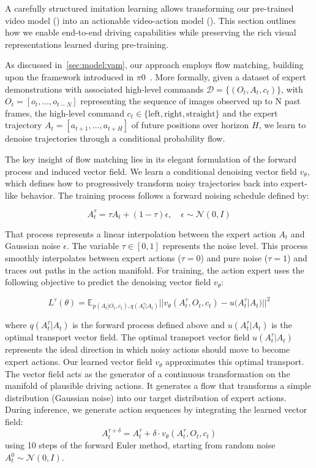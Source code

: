 A carefully structured imitation learning allows transforming our pre-trained video model (\vm{}) into an actionable video-action model (\vam{}). This section outlines how we enable end-to-end driving capabilities while preserving the rich visual representations learned during pre-training.

As discussed in~\autoref{sec:model:vam}, our approach employs flow matching, building upon the framework introduced in $\pi$0~\cite{black2024pi0}. More formally, given a dataset of expert demonstrations with associated high-level commands $\mathcal{D} = \{(O_t, A_t, c_t)\}$, with $O_t = [o_{t}, \dots, o_{t-N}]$ representing the sequence of images observed up to N past frames, the high-level command $c_t \in \{\text{left}, \text{right}, \text{straight}\}$ and the expert trajectory $A_t = [a_{t+1}, \dots, a_{t+H}]$ of future positions over horizon $H$, we learn to denoise trajectories through a conditional probability flow.


The key insight of flow matching lies in its elegant formulation of the forward process and induced vector field. We learn a conditional denoising vector field $v_\theta$, which defines how to progressively transform noisy trajectories back into expert-like behavior. The training process follows a forward noising schedule defined by:

\begin{equation}
    A^\tau_t = \tau A_t + (1-\tau)\epsilon, \quad \epsilon \sim \mathcal{N}(0, I)
    \label{eq:noised_action}
\end{equation}

That process represents a linear interpolation between the expert action $A_t$ and Gaussian noise $\epsilon$. The variable $\tau \in [0,1]$ represents the noise level. This process smoothly interpolates between expert actions ($\tau = 0$) and pure noise ($\tau = 1$) and traces out paths in the action manifold. For training, the action expert uses the following objective to predict the denoising vector field $v_\theta$:

\begin{equation}
    L^\tau(\theta) = \mathbb{E}_{p(A_t|O_t, c_t),q(A^\tau_t | A_t)} ||v_\theta(A^\tau_t, O_t, c_t) - u(A^\tau_t|A_t)||^2
\end{equation}

where $q(A^\tau_t|A_t)$ is the forward process defined above and $u(A^\tau_t|A_t)$ is the optimal transport vector field. The optimal transport vector field $u(A^\tau_t|A_t)$ represents the ideal direction in which noisy actions should move to become expert actions. Our learned vector field $v_\theta$ approximates this optimal transport.
%
The vector field acts as the generator of a continuous transformation on the manifold of plausible driving actions. It generates a flow that transforms a simple distribution (Gaussian noise) into our target distribution of expert actions.
%
During inference, we generate action sequences by integrating the learned vector field:
\begin{equation}
A^{\tau+\delta}_t = A^\tau_t + \delta \cdot v_\theta(A^\tau_t, O_t, c_t)
\end{equation}
using 10 steps of the forward Euler method, starting from random noise $A^0_t \sim \mathcal{N}(0, I)$.

